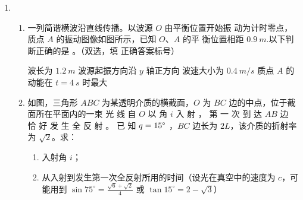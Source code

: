 \begin{enumerate}
\begin{enumerate}



\end{enumerate}


\item 
{}
\begin{enumerate}
	\item
一列简谐横波沿直线传播。以波源 $ O $ 由平衡位置开始振
动为计时零点，质点 $ A $ 的振动图像如图所示，已知 $ O $、$ A $ 的平
衡位置相距 $ 0.9 \ m $.以下判断正确的是 \underlinegap 。（双选，填
正确答案标号）
\begin{figure}[h!]
	\centering
	
\end{figure}


\fourchoices
{波长为 $ 1.2 \ m $}
{波源起振方向沿 $ y $ 轴正方向}
{波速大小为 $ 0.4 \ m /s $}
{质点 $ A $ 的动能在 $ t=4 \ s $ 时最大}



\item 
如图，三角形 $ ABC $ 为某透明介质的横截面，$ O $ 为 $ BC $ 边的中点，位于截面所在平面内的一束
光 线 自 $ O $ 以 角 $ i $ 入 射 ， 第 一 次 到 达 $ AB $ 边 恰 好 发 生 全 反 射 。 已 知
$ q=15  \degree  $ ，$ BC $ 边长为 $ 2L $，该介质的折射率为 $ \sqrt{2} $。求：
\begin{enumerate}
	\item
入射角 $ i $；
\item 
从入射到发生第一次全反射所用的时间（设光在真空中的速度为
$ c $，可能用到 $\sin 75^{\circ}=\frac{\sqrt{6}+\sqrt{2}}{4}$ 或 $\tan 15^{\circ}=2-\sqrt{3}$）
\end{enumerate}
\begin{figure}[h!]
	\flushright
	
\end{figure}



\end{enumerate}
\end{enumerate}
